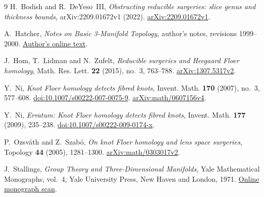 \documentclass[11pt]{article}
\theoremstyle{remark}
\begin{document}
\begin{thebibliography}{9}
H.~Bodish and R.~DeYeso~III,
\emph{Obstructing reducible surgeries: slice genus and thickness bounds},
arXiv:2209.01672v1 (2022).
\href{https://arxiv.org/abs/2209.01672v1}{arXiv:2209.01672v1}.

A.~Hatcher, \emph{Notes on Basic 3-Manifold Topology},
author's notes, revisions 1999--2000.
\href{https://pi.math.cornell.edu/~hatcher/3M/3M.pdf}{Author's online text}.

J.~Hom, T.~Lidman and N.~Zufelt,
\emph{Reducible surgeries and Heegaard Floer homology},
Math. Res. Lett. \textbf{22} (2015), no.~3, 763--788.
\href{https://arxiv.org/abs/1307.5317v2}{arXiv:1307.5317v2}.

Y.~Ni, \emph{Knot Floer homology detects fibred knots},
Invent. Math. \textbf{170} (2007), no.~3, 577--608.
\href{https://doi.org/10.1007/s00222-007-0075-9}{doi:10.1007/s00222-007-0075-9}.
\href{https://arxiv.org/abs/math/0607156v4}{arXiv:math/0607156v4}.

Y.~Ni, \emph{Erratum: Knot Floer homology detects fibred knots},
Invent. Math. \textbf{177} (2009), 235--238.
\href{https://doi.org/10.1007/s00222-009-0174-x}{doi:10.1007/s00222-009-0174-x}.

P.~Ozsv\'ath and Z.~Szab\'o,
\emph{On knot Floer homology and lens space surgeries},
Topology \textbf{44} (2005), 1281--1300.
\href{https://arxiv.org/abs/math/0303017v2}{arXiv:math/0303017v2}.

J.~Stallings, \emph{Group Theory and Three-Dimensional Manifolds},
Yale Mathematical Monographs, vol.~4, Yale University Press,
New Haven and London, 1971.
\href{https://webhomes.maths.ed.ac.uk/~v1ranick/papers/stallings1.pdf}{Online monograph scan}.
\end{thebibliography}
\end{document}
